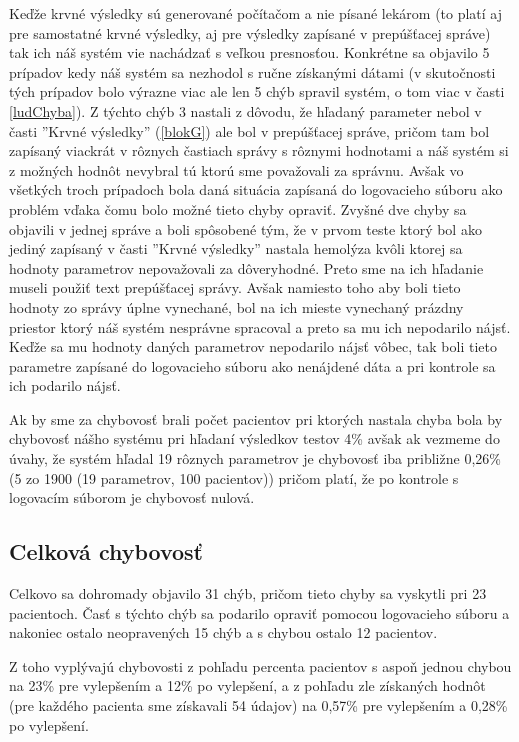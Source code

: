 Keďže krvné výsledky sú generované počítačom a nie písané lekárom (to platí aj pre samostatné krvné výsledky, aj pre výsledky zapísané v prepúšťacej správe) tak ich náš systém vie nachádzať s veľkou presnosťou. Konkrétne sa objavilo 5 prípadov kedy náš systém sa nezhodol s ručne získanými dátami (v skutočnosti tých prípadov bolo výrazne viac ale len 5 chýb spravil systém, o tom viac v časti \ref{ludChyba}). Z týchto chýb 3 nastali z dôvodu, že hľadaný parameter nebol v časti ''Krvné výsledky'' (\ref{blokG}) ale bol v prepúšťacej správe, pričom tam bol zapísaný viackrát v rôznych častiach správy s rôznymi hodnotami a náš systém si z možných hodnôt nevybral tú ktorú sme považovali za správnu. Avšak vo všetkých troch prípadoch bola daná situácia zapísaná do logovacieho súboru ako problém vďaka čomu bolo možné tieto chyby opraviť. Zvyšné dve chyby sa objavili v jednej správe a boli spôsobené tým, že v prvom teste ktorý bol ako jediný zapísaný v časti ''Krvné výsledky'' nastala hemolýza kvôli ktorej sa hodnoty parametrov nepovažovali za dôveryhodné. Preto sme na ich hľadanie museli použiť text prepúšťacej správy. Avšak namiesto toho aby boli tieto hodnoty zo správy úplne vynechané, bol na ich mieste vynechaný prázdny priestor ktorý náš systém nesprávne spracoval a preto sa mu ich nepodarilo nájsť. Keďže sa mu hodnoty daných parametrov nepodarilo nájsť vôbec, tak boli tieto parametre zapísané do logovacieho súboru ako nenájdené dáta a pri kontrole sa ich podarilo nájsť.

Ak by sme za chybovosť brali počet pacientov pri ktorých nastala chyba bola by chybovosť nášho systému pri hľadaní výsledkov testov 4\% avšak ak vezmeme do úvahy, že systém hľadal 19 rôznych parametrov je chybovosť iba približne 0,26\% (5 zo 1900 (19 parametrov, 100 pacientov)) pričom platí, že po kontrole s logovacím súborom je chybovosť nulová.

\subsection{Celková chybovosť}

Celkovo sa dohromady objavilo 31 chýb, pričom tieto chyby sa vyskytli pri 23 pacientoch. Časť s týchto chýb sa podarilo opraviť pomocou logovacieho súboru a nakoniec ostalo neopravených 15 chýb a s chybou ostalo 12 pacientov.

Z toho vyplývajú chybovosti z pohľadu percenta pacientov s aspoň jednou chybou na 23\% pre vylepšením a 12\% po vylepšení, a z pohľadu zle získaných hodnôt (pre každého pacienta sme získavali 54 údajov) na 0,57\% pre vylepšením a 0,28\% po vylepšení.

